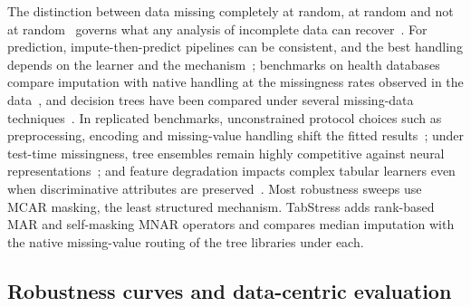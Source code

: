 \documentclass[pdflatex,sn-mathphys]{sn-jnl}
\theoremstyle{thmstyleone}
\theoremstyle{thmstyletwo}
\theoremstyle{thmstylethree}
\begin{document}
The distinction between data missing completely at random, at random and not at random~\cite{rubin1976inference} governs what any analysis of incomplete data can recover~\cite{little2019statistical}. For prediction, impute-then-predict pipelines can be consistent, and the best handling depends on the learner and the mechanism~\cite{josse2024consistency,lemorvan2021whats}; benchmarks on health databases compare imputation with native handling at the missingness rates observed in the data~\cite{perezlebel2022benchmarking}, and decision trees have been compared under several missing-data techniques~\cite{twala2008good}. In replicated benchmarks, unconstrained protocol choices such as preprocessing, encoding and missing-value handling shift the fitted results~\cite{bischl2021openml,mcelfresh2023when}; under test-time missingness, tree ensembles remain highly competitive against neural representations~\cite{lemorvan2021whats,mcelfresh2023when}; and feature degradation impacts complex tabular learners even when discriminative attributes are preserved~\cite{borisov2024deep,hollmann2023tabpfn}. Most robustness sweeps use MCAR masking, the least structured mechanism. TabStress adds rank-based MAR and self-masking MNAR operators and compares median imputation with the native missing-value routing of the tree libraries under each.

\subsection{Robustness curves and data-centric evaluation}\label{sec:related:curves}
\end{document}
